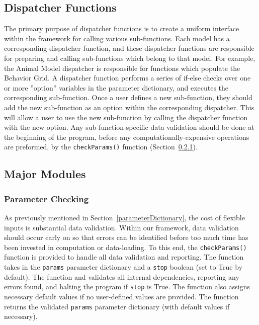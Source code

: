 \subsection{Dispatcher Functions}
\label{dispatcherFunctions}
The primary purpose of dispatcher functions is to create a uniform interface within the framework for calling various sub-functions.  Each model has a corresponding dispatcher function, and these dispatcher functions are responsible for preparing and calling sub-functions which belong to that model.  For example, the Animal Model dispatcher is responsible for functions which populate the Behavior Grid.  A dispatcher function performs a series of if-else checks over one or more ''option'' variables in the parameter dictionary, and executes the corresponding sub-function.  Once a user defines a new sub-function, they should add the new sub-function as an option within the corresponding dispatcher.  This will allow a user to use the new sub-function by calling the dispatcher function with the new option.  Any sub-function-specific data validation should be done at the beginning of the program, before any computationally-expensive operations are preformed, by the \texttt{checkParams()} function (Section~\ref{checkParams}).


\subsection{Major Modules}
\label{majorModules}
\subsubsection{Parameter Checking}
\label{checkParams}
As previously mentioned in Section~\ref{parameterDictionary}, the cost of flexible inputs is substantial data validation.  Within our framework, data validation should occur early on so that errors can be identified before too much time has been invested in computation or data-loading.  To this end, the \texttt{checkParams()} function is provided to handle all data validation and reporting.  The function takes in the \texttt{params} parameter dictionary and a \texttt{stop} boolean (set to True by default).  The function and validates all internal dependencies, reporting any errors found, and halting the program if \texttt{stop} is True.  The function also assigns necessary default values if no user-defined values are provided.  The function returns the validated \texttt{params} parameter dictionary (with default values if necessary).  

